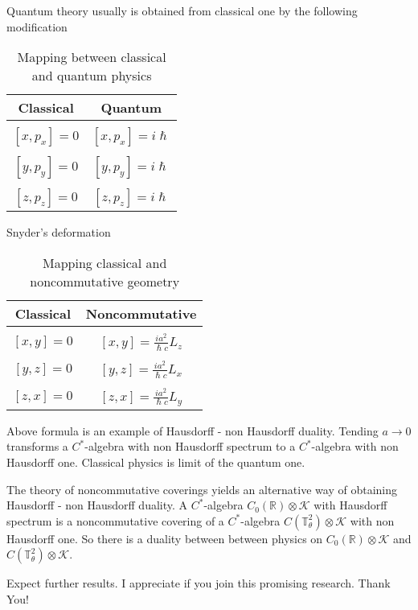 \documentclass{beamer}
\theoremstyle{plain}
\begin{document}
\begin{frame}
Quantum theory usually is obtained from classical one by the following modification
\break
\begin {table}[H]
\caption {Mapping between classical and quantum physics} \label{main_mapping_table} 
\begin{center}
	\begin{tabular}{|c|c|}
		\hline
		Classical  & Quantum\\
		\hline
		&\\
		$\left[ x, p_x\right] = 0$ & $\left[ x, p_x\right] = i \hslash$ \\
		&\\
		$\left[ y, p_y\right] = 0$ & $\left[ y, p_y\right] = i \hslash$\\
		&\\
$\left[ z, p_z\right] = 0$ & $\left[ z, p_z\right] = i \hslash$\\
		\hline
	\end{tabular}
\end{center}
\end {table}


\end{frame}
\begin{frame}
	Snyder's deformation
	\break
	\begin {table}[H]
	\caption {Mapping classical  and noncommutative geometry} \label{s_mapping_table} 
	\begin{center}
		\begin{tabular}{|c|c|}
			\hline
			Classical  & Noncommutative\\
			\hline
			&\\
			$\left[ x, y\right] = 0$ & $\left[ x, y\right] = \frac{i a^2}{\hslash c}L_z$ \\
			&\\
$\left[ y, z\right] = 0$ & $\left[ y, z\right] = \frac{i a^2}{\hslash c}L_x$ \\
			&\\
$\left[ z, x\right] = 0$ & $\left[ z, x\right] = \frac{i a^2}{\hslash c}L_y$ \\
			\hline
		\end{tabular}
	\end{center}
	\end {table}
Above formula is an example of Hausdorff - non Hausdorff duality. Tending $a \to 0$ transforms a $C^*$-algebra with non Hausdorff spectrum to a $C^*$-algebra with non Hausdorff one. Classical physics is limit of the quantum one.	
\end{frame}
\begin{frame}
	The theory of noncommutative coverings yields an alternative way of obtaining Hausdorff - non Hausdorff duality. A $C^*$-algebra 	$C_0\left( \mathbb R \right) \otimes \mathcal K$  with Hausdorff spectrum is a noncommutative covering of a $C^*$-algebra 	$C\left( \mathbb T^2_\theta \right) \otimes \mathcal K$ with non Hausdorff one. So there is a duality between between physics on
	$C_0\left( \mathbb R \right) \otimes \mathcal K$  and	$C\left( \mathbb T^2_\theta \right) \otimes \mathcal K$.
\end{frame}

\begin{frame}
	\begin{center}
		\Huge
		Expect further results.
		\newline
		I appreciate if you join this promising research.
		\newline
		\alert{Thank You!}
	\end{center}
\end{frame}
\end{document}
